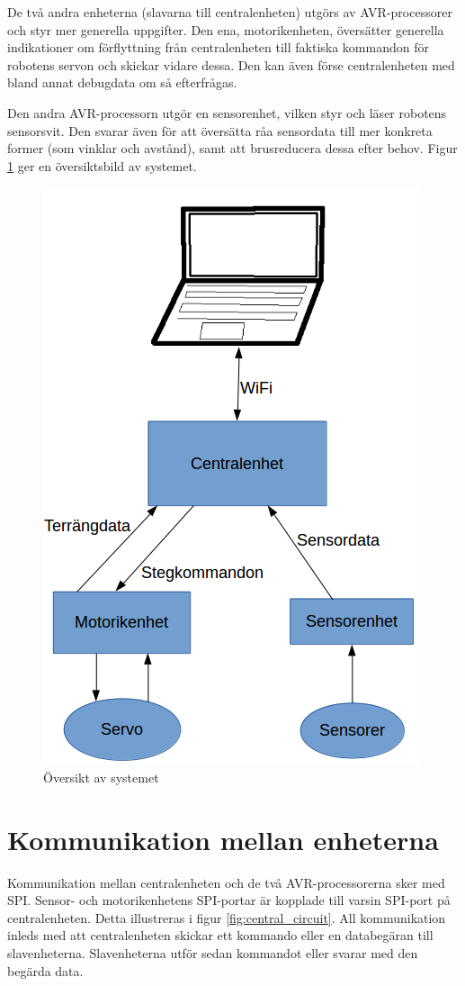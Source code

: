 \documentclass[a4paper,titlepage,12pt]{article}
\begin{document}
	De två andra enheterna (slavarna till centralenheten) utgörs av AVR-processorer och styr 
	mer generella uppgifter. Den ena, motorikenheten, översätter generella indikationer om 
	förflyttning från centralenheten till faktiska kommandon för robotens servon och skickar 
	vidare dessa. Den kan även förse centralenheten med bland annat debugdata om så efterfrågas.
	
	Den andra AVR-processorn utgör en sensorenhet, vilken styr och läser robotens sensorsvit. 
	Den svarar även för att översätta råa sensordata till mer konkreta former (som vinklar och 
	avstånd), samt att brusreducera dessa efter behov. Figur \ref{fig:overview} ger en översiktsbild av
	systemet.
	
	\begin{figure}[h!]
		\centering
		\includegraphics[width=0.5\linewidth]{../images/overview.png}
		\caption{Översikt av systemet\label{fig:overview}}
	\end{figure}

	\newpage

	\section{Kommunikation mellan enheterna}
	Kommunikation mellan centralenheten och de två AVR-processorerna sker
	med SPI. Sensor- och motorikenhetens SPI-portar är kopplade till varsin
  SPI-port på centralenheten. Detta illustreras i figur \ref{fig:central_circuit}.
	All kommunikation inleds med att centralenheten skickar ett kommando 
    eller en databegäran till slavenheterna.
	Slavenheterna utför sedan kommandot eller svarar med den begärda data.
\end{document}
